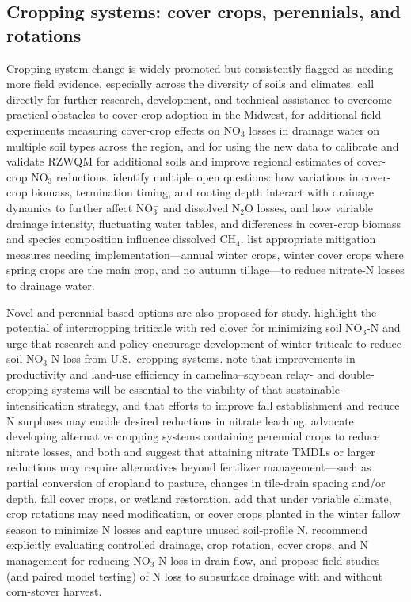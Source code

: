 \subsection{Cropping systems: cover crops, perennials, and rotations}
Cropping-system change is widely promoted but consistently flagged as needing more field evidence, especially across the diversity of soils and climates. \textcite{Kladivko2014} call directly for further research, development, and technical assistance to overcome practical obstacles to cover-crop adoption in the Midwest, for additional field experiments measuring cover-crop effects on NO$_3$ losses in drainage water on multiple soil types across the region, and for using the new data to calibrate and validate RZWQM for additional soils and improve regional estimates of cover-crop NO$_3$ reductions. \textcite{Oliveira2025} identify multiple open questions: how variations in cover-crop biomass, termination timing, and rooting depth interact with drainage dynamics to further affect NO$_3^-$ and dissolved N$_2$O losses, and how variable drainage intensity, fluctuating water tables, and differences in cover-crop biomass and species composition influence dissolved CH$_4$. \textcite{Lagzdins2015} list appropriate mitigation measures needing implementation---annual winter crops, winter cover crops where spring crops are the main crop, and no autumn tillage---to reduce nitrate-N losses to drainage water.

Novel and perennial-based options are also proposed for study. \textcite{Nance2007} highlight the potential of intercropping triticale with red clover for minimizing soil NO$_3$-N and urge that research and policy encourage development of winter triticale to reduce soil NO$_3$-N loss from U.S.\ cropping systems. \textcite{Emmett2022} note that improvements in productivity and land-use efficiency in camelina--soybean relay- and double-cropping systems will be essential to the viability of that sustainable-intensification strategy, and that efforts to improve fall establishment and reduce N surpluses may enable desired reductions in nitrate leaching. \textcite{Randall2001} advocate developing alternative cropping systems containing perennial crops to reduce nitrate losses, and both \textcite{Gowda2007} and \textcite{Nangia2008} suggest that attaining nitrate TMDLs or larger reductions may require alternatives beyond fertilizer management---such as partial conversion of cropland to pasture, changes in tile-drain spacing and/or depth, fall cover crops, or wetland restoration. \textcite{Kaur2024c} add that under variable climate, crop rotations may need modification, or cover crops planted in the winter fallow season to minimize N losses and capture unused soil-profile N. \textcite{Ma2007b} recommend explicitly evaluating controlled drainage, crop rotation, cover crops, and N management for reducing NO$_3$-N loss in drain flow, and \textcite{Malone2019} propose field studies (and paired model testing) of N loss to subsurface drainage with and without corn-stover harvest.

